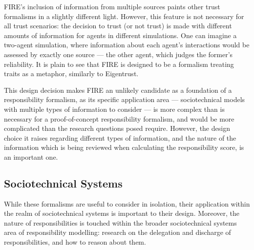 FIRE's inclusion of information from multiple sources paints other trust formalisms in a slightly different light. However, this feature is not necessary for all trust scenarios: the decision to trust (or not trust) is made with different amounts of information for agents in different simulations. One can imagine a two-agent simulation, where information about each agent's interactions would be assessed by exactly one source --- the other agent, which judges the former's reliability. It is plain to see that FIRE is designed to be a formalism treating traits as a metaphor, similarly to Eigentrust.\par

This design decision makes FIRE an unlikely candidate as a foundation of a responsibility formalism, as its specific application area --- sociotechnical models with multiple types of information to consider --- is more complex than is necessary for a proof-of-concept responsibility formalism, and would be more complicated than the research questions posed require. However, the design choice it raises regarding different types of information, and the nature of the information which is being reviewed when calculating the responsibility score, is an important one.\par

\subsection{Sociotechnical Systems}
While these formalisms are useful to consider in isolation, their application within the realm of sociotechnical systems is important to their design. Moreover, the nature of responsibilities is touched within the broader sociotechnical systems area of responsibility modelling: research on the delegation and discharge of responsibilities, and how to reason about them.\par

